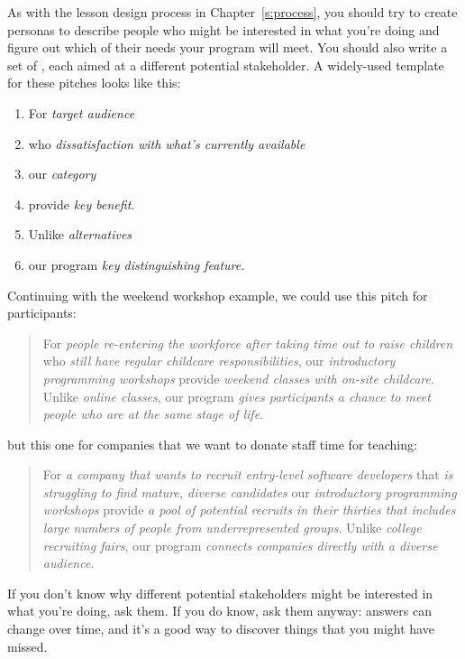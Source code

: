 As with the lesson design process in Chapter~\ref{s:process}, you should
try to create personas to describe people who might be interested in
what you're doing and figure out which of their needs your program
will meet. You should also write a set of , each aimed at a different potential
stakeholder. A widely-used template for these pitches looks like this:

\begin{enumerate}
\item
  For \emph{target audience}
\item
  who \emph{dissatisfaction with what's currently available}
\item
  our \emph{category}
\item
  provide \emph{key benefit}.
\item
  Unlike \emph{alternatives}
\item
  our program \emph{key distinguishing feature.}
\end{enumerate}

Continuing with the weekend workshop example, we could use this pitch
for participants:

\begin{quote}

For \emph{people re-entering the workforce after taking time out to raise
children} who \emph{still have regular childcare responsibilities}, our
\emph{introductory programming workshops} provide \emph{weekend classes with
on-site childcare}. Unlike \emph{online classes}, our program \emph{gives
participants a chance to meet people who are at the same stage of
life}.

\end{quote}

but this one for companies that we want to donate staff time for
teaching:

\begin{quote}

For \emph{a company that wants to recruit entry-level software developers}
that \emph{is struggling to find mature, diverse candidates} our
\emph{introductory programming workshops} provide \emph{a pool of potential
recruits in their thirties that includes large numbers of people from
underrepresented groups}. Unlike \emph{college recruiting fairs}, our
program \emph{connects companies directly with a diverse audience}.

\end{quote}

If you don't know why different potential stakeholders might be
interested in what you're doing, ask them. If you do know, ask them
anyway: answers can change over time, and it's a good way to discover
things that you might have missed.

